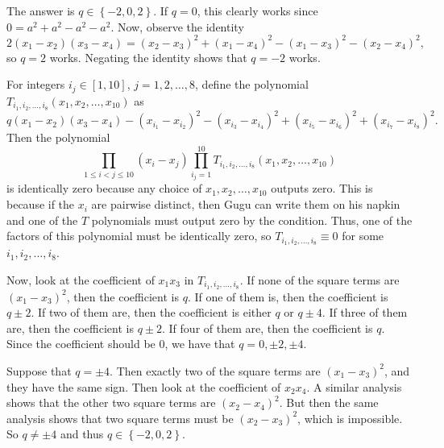 The answer is $\boxed{q\in\left\{-2,0,2\right\}}$. If $q=0$, this clearly works since $0=a^2+a^2-a^2-a^2$. Now, observe the identity \[2\left(x_1-x_2\right)\left(x_3-x_4\right)=\left(x_2-x_3\right)^2+\left(x_1-x_4\right)^2-\left(x_1-x_3\right)^2-\left(x_2-x_4\right)^2,\] so $q=2$ works. Negating the identity shows that $q=-2$ works.

For integers $i_j\in\left[1,10\right]$, $j=1,2,\ldots,8$, define the polynomial $T_{i_1,i_2,\ldots,i_8}\left(x_1,x_2,\ldots,x_{10}\right)$ as \[q\left(x_1-x_2\right)\left(x_3-x_4\right)-\left(x_{i_1}-x_{i_2}\right)^2-\left(x_{i_3}-x_{i_4}\right)^2+\left(x_{i_5}-x_{i_6}\right)^2+\left(x_{i_7}-x_{i_8}\right)^2.\] Then the polynomial \[\displaystyle\prod_{1\leq i<j\leq10}\left(x_i-x_j\right)\displaystyle\prod_{i_j=1}^{10}T_{i_1,i_2,\ldots,i_8}\left(x_1,x_2,\ldots,x_{10}\right)\] is identically zero because any choice of $x_1,x_2,\ldots,x_{10}$ outputs zero. This is because if the $x_i$ are pairwise distinct, then Gugu can write them on his napkin and one of the $T$ polynomials must output zero by the condition. Thus, one of the factors of this polynomial must be identically zero, so $T_{i_1,i_2,\ldots,i_8}\equiv0$ for some $i_1,i_2,\ldots,i_8$.

Now, look at the coefficient of $x_1x_3$ in $T_{i_1,i_2,\ldots,i_8}$. If none of the square terms are $\left(x_1-x_3\right)^2$, then the coefficient is $q$. If one of them is, then the coefficient is $q\pm2$. If two of them are, then the coefficient is either $q$ or $q\pm4$. If three of them are, then the coefficient is $q\pm2$. If four of them are, then the coefficient is $q$. Since the coefficient should be $0$, we have that $q=0,\pm2,\pm4$.

Suppose that $q=\pm4$. Then exactly two of the square terms are $\left(x_1-x_3\right)^2$, and they have the same sign. Then look at the coefficient of $x_2x_4$. A similar analysis shows that the other two square terms are $\left(x_2-x_4\right)^2$. But then the same analysis shows that two square terms must be $\left(x_2-x_3\right)^2$, which is impossible. So $q\neq\pm4$ and thus $q\in\left\{-2,0,2\right\}$.